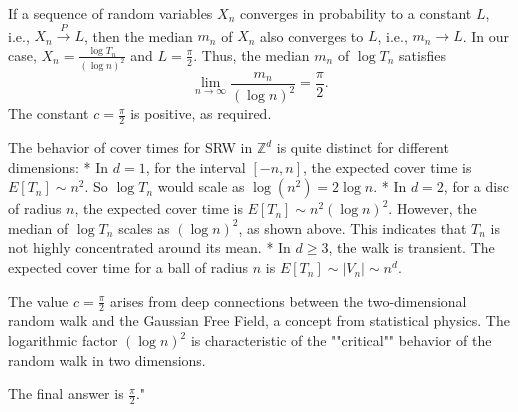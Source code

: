 \documentclass[11pt]{article}
\begin{document}
If a sequence of random variables $X_n$ converges in probability to a constant $L$, i.e., $X_n \xrightarrow{P} L$, then the median $m_n$ of $X_n$ also converges to $L$, i.e., $m_n \to L$.
In our case, $X_n = \frac{\log T_n}{(\log n)^2}$ and $L = \frac{\pi}{2}$.
Thus, the median $m_n$ of $\log T_n$ satisfies
$$
\lim _{n \rightarrow \infty} \frac{m_n}{(\log n)^2} = \frac{\pi}{2}.
$$
The constant $c = \frac{\pi}{2}$ is positive, as required.

The behavior of cover times for SRW in $\mathbb{Z}^d$ is quite distinct for different dimensions:
*   In $d=1$, for the interval $[-n, n]$, the expected cover time is $E[T_n] \sim n^2$. So $\log T_n$ would scale as $\log(n^2) = 2 \log n$.
*   In $d=2$, for a disc of radius $n$, the expected cover time is $E[T_n] \sim n^2 (\log n)^2$. However, the median of $\log T_n$ scales as $(\log n)^2$, as shown above. This indicates that $T_n$ is not highly concentrated around its mean.
*   In $d \geq 3$, the walk is transient. The expected cover time for a ball of radius $n$ is $E[T_n] \sim |V_n| \sim n^d$.

The value $c = \frac{\pi}{2}$ arises from deep connections between the two-dimensional random walk and the Gaussian Free Field, a concept from statistical physics. The logarithmic factor $(\log n)^2$ is characteristic of the ""critical"" behavior of the random walk in two dimensions.

The final answer is $\boxed{\frac{\pi}{2}}$."
\end{document}
